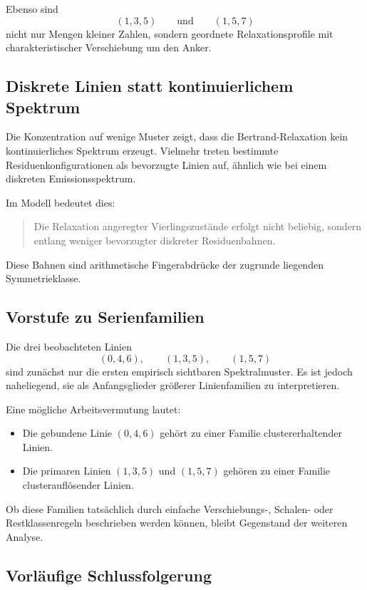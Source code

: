\documentclass[11pt,a4paper]{article}
\theoremstyle{definition}
\theoremstyle{plain}
\theoremstyle{remark}
\begin{document}
	Ebenso sind
	\[
	(1,3,5)
	\qquad\text{und}\qquad
	(1,5,7)
	\]
	nicht nur Mengen kleiner Zahlen, sondern geordnete Relaxationsprofile mit charakteristischer Verschiebung um den Anker.
	
	\subsection{Diskrete Linien statt kontinuierlichem Spektrum}
	
	Die Konzentration auf wenige Muster zeigt, dass die Bertrand-Relaxation kein kontinuierliches Spektrum erzeugt. 
	Vielmehr treten bestimmte Residuenkonfigurationen als bevorzugte Linien auf, ähnlich wie bei einem diskreten Emissionsspektrum.
	
	Im Modell bedeutet dies:
	
	\begin{quote}
		Die Relaxation angeregter Vierlingszustände erfolgt nicht beliebig, sondern entlang weniger bevorzugter diskreter Residuenbahnen.
	\end{quote}
	
	Diese Bahnen sind arithmetische Fingerabdrücke der zugrunde liegenden Symmetrieklasse.
	
	\subsection{Vorstufe zu Serienfamilien}
	
	Die drei beobachteten Linien
	\[
	(0,4,6),\qquad (1,3,5),\qquad (1,5,7)
	\]
	sind zunächst nur die ersten empirisch sichtbaren Spektralmuster. 
	Es ist jedoch naheliegend, sie als Anfangsglieder größerer Linienfamilien zu interpretieren.
	
	Eine mögliche Arbeitsvermutung lautet:
	
	\begin{itemize}
		\item Die gebundene Linie \((0,4,6)\) gehört zu einer Familie clustererhaltender Linien.
		\item Die primaren Linien \((1,3,5)\) und \((1,5,7)\) gehören zu einer Familie clusterauflösender Linien.
	\end{itemize}
	
	Ob diese Familien tatsächlich durch einfache Verschiebungs-, Schalen- oder Restklassenregeln beschrieben werden können, bleibt Gegenstand der weiteren Analyse.
	
	\subsection{Vorläufige Schlussfolgerung}
	
\end{document}
